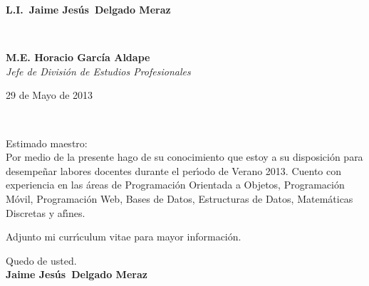 \documentclass[11pt]{article}
\def\firstname{Jaime Jes\'us}
\def\familyname{Delgado Meraz}
\def\FileAuthor{\firstname~\familyname}
\begin{document}
\sffamily   %
\hfill%
\begin{minipage}[t]{.6\textwidth}
\raggedleft%
{\bfseries L.I.~\FileAuthor}\\[.35ex]
\small\itshape%
\end{minipage}\\[1em]
%
\begin{minipage}[t]{.4\textwidth}
\raggedright%
{\bfseries M.E. Horacio Garc\'ia Aldape}\\[.35ex]
\small\itshape%
Jefe de Divisi\'on de Estudios Profesionales
\end{minipage}
\hfill %
\begin{minipage}[t]{.4\textwidth}
\raggedleft %
29 de Mayo de 2013
\end{minipage}\\[2em]
\raggedright
Estimado maestro:\\[1.5em]

Por medio de la presente hago de su conocimiento que estoy a su disposici\'on para desempe\~nar labores docentes durante el per{\'\i}odo de Verano 2013. Cuento con experiencia en las \'areas de Programaci\'on Orientada a Objetos, Programaci\'on M\'ovil, Programaci\'on Web, Bases de Datos, Estructuras de Datos, Matem\'aticas Discretas y af{\'\i}nes.

Adjunto mi curr{\'\i}culum vitae para mayor informaci\'on.


Quedo de usted.\\[3em] %
%
{\bfseries \FileAuthor}\\
%
\vfill%
\end{document}
